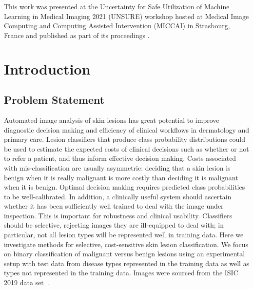 This work was presented at the Uncertainty for Safe Utilization of Machine Learning in Medical Imaging 2021 (UNSURE) workshop hosted at Medical Image Computing and Computing Assisted Intervention (MICCAI) in Strasbourg, France and published as part of its proceedings \citep{carse2021robust}.



\section{Introduction}
\label{sec:selective_introduction}
\subsection{Problem Statement}
\label{subsec:selective_probelm_statement}
Automated image analysis of skin lesions has great potential to improve diagnostic decision making and efficiency of clinical workflows in dermatology and primary care. Lesion classifiers that produce class probability distributions could be used to estimate the expected costs of clinical decisions such as whether or not to refer a patient, and thus inform effective decision making. Costs associated with mis-classification are usually asymmetric: deciding that a skin lesion is benign when it is really malignant is more costly than deciding it is malignant when it is benign. Optimal decision making requires predicted class probabilities to be well-calibrated. In addition, a clinically useful system should ascertain whether it has been sufficiently well trained to deal with the image under inspection. This is important for robustness and clinical usability. Classifiers should be selective, rejecting images they are ill-equipped to deal with; in particular, not all lesion types will be represented well in training data. Here we investigate methods for selective, cost-sensitive skin lesion classification. We focus on binary classification of malignant versus benign lesions using an experimental setup with test data from disease types represented in the training data as well as types not represented in the training data. Images were sourced from the ISIC 2019 data set~\citep{codella2018skin,Combalia2019,Tschandl2018}.

